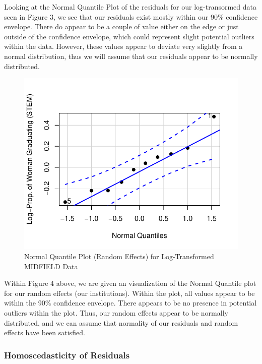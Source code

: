 \documentclass[]{article}
\begin{document}
Looking at the Normal Quantile Plot of the residuals for our
log-transormed data seen in Figure 3, we see that our residuals exist
mostly within our 90\% confidence envelope. There do appear to be a
couple of value either on the edge or just outside of the confidence
envelope, which could represent slight potential outliers within the
data. However, these values appear to deviate very slightly from a
normal distribution, thus we will assume that our residuals appear to be
normally distributed.

\begin{figure}
\centering
\includegraphics{Stat_461_Final_Project_Report_files/figure-latex/logNormalityRE-1.pdf}
\caption{Normal Quantile Plot (Random Effects) for Log-Transformed
MIDFIELD Data}
\end{figure}

Within Figure 4 above, we are given an visualization of the Normal
Quantile plot for our random effects (our institutions). Within the
plot, all values appear to be within the 90\% confidence envelope. There
appears to be no presence in potential outliers within the plot. Thus,
our random effects appear to be normally distributed, and we can assume
that normality of our residuals and random effects have been satisfied.

\subsubsection{Homoscedasticity of
Residuals}\label{homoscedasticity-of-residuals}
\end{document}
